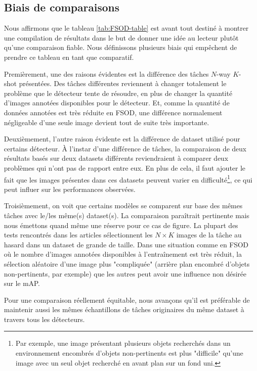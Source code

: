 \subsection*{Biais de comparaisons}
Nous affirmons que le tableau \ref{tab:FSOD-table} est avant tout destiné à montrer une compilation de résultats dans le but de donner une idée au lecteur plutôt qu'une comparaison fiable. Nous définissons plusieurs biais qui empêchent de prendre ce tableau en tant que comparatif.

Premièrement, une des raisons évidentes est la différence des tâches $N$-way $K$-shot présentées. Des tâches différentes reviennent à changer totalement le problème que le détecteur tente de résoudre, en plus de changer la quantité d'images annotées disponibles pour le détecteur. Et, comme la quantité de données annotées est très réduite en FSOD, une différence normalement négligeable d'une seule image devient tout de suite très importante.

Deuxièmement, l'autre raison évidente est la différence de dataset utilisé pour certains détecteur. À l'instar d'une différence de tâches, la comparaison de deux résultats basés sur deux datasets différents reviendraient à comparer deux problèmes qui n'ont pas de rapport entre eux. En plus de cela, il faut ajouter le fait que les images présentes dans ces datasets peuvent varier en difficulté\footnote{Par exemple, une image présentant plusieurs objets recherchés dans un environnement encombrés d'objets non-pertinents est plus "difficile" qu'une image avec un seul objet recherché en avant plan sur un fond uni.}, ce qui peut influer sur les performances observées.

Troisièmement, on voit que certains modèles se comparent sur base des mêmes tâches avec le/les même(s) dataset(s). La comparaison paraîtrait pertinente mais nous émettons quand même une réserve pour ce cas de figure. La plupart des tests rencontrés dans les articles sélectionnent les $N \times K$ images de la tâche au hasard dans un dataset de grande de taille. Dans une situation comme en FSOD où le nombre d'images annotées disponibles à l'entraînement est très réduit, la sélection aléatoire d'une image plus "compliquée" (arrière plan encombré d'objets non-pertinents, par exemple) que les autres peut avoir une influence non désirée sur le mAP. 

Pour une comparaison réellement équitable, nous avançons qu'il est préférable de maintenir aussi les mêmes échantillons de tâches originaires du même dataset à travers tous les détecteurs.

